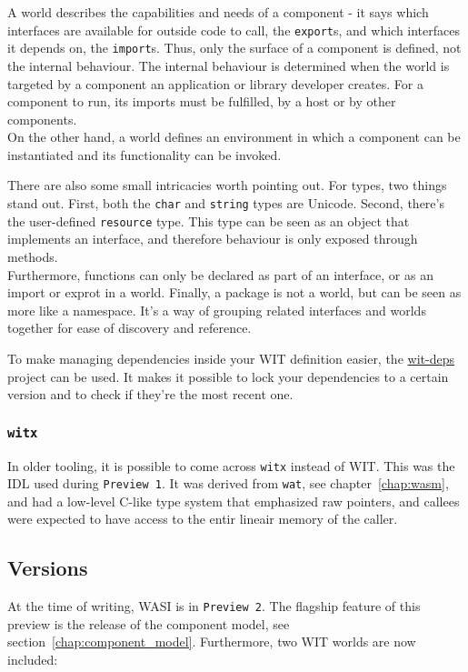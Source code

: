 A world describes the capabilities and needs of a component - it says which interfaces are available for outside code to call, the \texttt{export}s, and which interfaces it depends on, the \texttt{import}s. Thus, only the surface of a component is defined, not the internal behaviour. The internal behaviour is determined when the world is targeted by a component an application or library developer creates. For a component to run, its imports must be fulfilled, by a host or by other components. \\
On the other hand, a world defines an environment in which a component can be instantiated and its functionality can be invoked.

There are also some small intricacies worth pointing out. For types, two things stand out. First, both the \texttt{char} and \texttt{string} types are Unicode. Second, there's the user-defined \texttt{resource} type. This type can be seen as an object that implements an interface, and therefore behaviour is only exposed through methods. \\
Furthermore, functions can only be declared as part of an interface, or as an import or exprot in a world. Finally, a package is not a world, but can be seen as more like a namespace. It's a way of grouping related interfaces and worlds together for ease of discovery and reference.


To make managing dependencies inside your \gls{WIT} definition easier, the \href{https://github.com/bytecodealliance/wit-deps}{wit-deps} project can be used. It makes it possible to lock your dependencies to a certain version and to check if they're the most recent one.

\subsubsection{\texttt{witx}}

In older tooling, it is possible to come across \texttt{witx} instead of \gls{WIT}. This was the \gls{IDL} used during \texttt{Preview 1}. It was derived from \texttt{wat}, see chapter~\ref{chap:wasm}, and had a low-level C-like type system that emphasized raw pointers, and callees were expected to have access to the entir lineair memory of the caller.

\subsection{Versions}
\label{sec:versions}
At the time of writing, \gls{WASI} is in \texttt{Preview 2}. The flagship feature of this preview is the release of the component model, see section~\ref{chap:component_model}. Furthermore, two \gls{WIT} worlds are now included:

